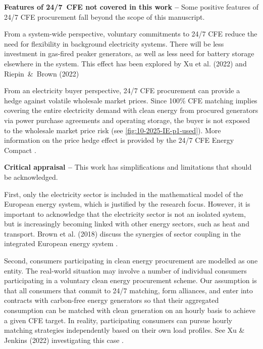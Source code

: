 \textbf{Features of 24/7~CFE not covered in this work --} Some positive features of 24/7 CFE procurement fall beyond the scope of this manuscript.

From a system-wide perspective, voluntary commitments to 24/7 CFE reduce the need for flexibility in background electricity systems. 
There will be less investment in gas-fired peaker generators, as well as less need for battery storage elsewhere in the system.
This effect has been explored by Xu et al. (2022) and Riepin~\&~Brown (2022) \cite{riepin-zenodo-systemlevel247,xu-247CFE-report}

From an electricity buyer perspective, 24/7 CFE procurement can provide a hedge against volatile wholesale market prices.
Since 100\% CFE matching implies covering the entire electricity demand with clean energy from procured generators via power purchase agreements and operating storage, the buyer is not exposed to the wholesale market price risk (see \cref{fig:10-2025-IE-p1-used}).
More information on the price hedge effect is provided by the 24/7 CFE Energy Compact \cite{gocarbonfree247}.


\textbf{Critical appraisal --} This work has simplifications and limitations that should be acknowledged.

First, only the electricity sector is included in the mathematical model of the European energy system, which is justified by the research focus.
However, it is important to acknowledge that the electricity sector is not an isolated system, but is increasingly becoming linked with other energy sectors, such as heat and transport.
Brown et al. (2018) discuss the synergies of sector coupling in the integrated European energy system \cite{brownSynergiesSectorCoupling2018}.

Second, consumers participating in clean energy procurement are modelled as one entity.
The real-world situation may involve a number of individual consumers participating in a voluntary clean energy procurement scheme.
Our assumption is that all consumers that commit to 24/7 matching, form alliances, and enter into contracts with carbon-free energy generators so that their aggregated consumption can be matched with clean generation on an hourly basis to achieve a given CFE target.
In reality, participating consumers can pursue hourly matching strategies independently based on their own load profiles.
See Xu \& Jenkins (2022) investigating this case \cite{princeton-TEACs-2022}.

